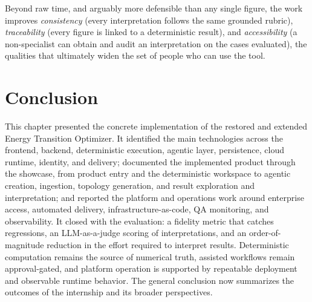 Beyond raw time, and arguably more defensible than any single figure, the work
improves \emph{consistency} (every interpretation follows the same grounded
rubric), \emph{traceability} (every figure is linked to a deterministic result),
and \emph{accessibility} (a non-specialist can obtain and audit an interpretation
on the cases evaluated), the qualities that ultimately widen the set of people who
can use the tool.

\section*{Conclusion}

This chapter presented the concrete implementation of the restored and extended
Energy Transition Optimizer. It identified the main technologies across the
frontend, backend, deterministic execution, agentic layer, persistence, cloud
runtime, identity, and delivery; documented the
implemented product through the showcase, from product entry and the deterministic
workspace to agentic creation, ingestion, topology generation, and result
exploration and interpretation; and reported the
platform and operations work around enterprise access, automated delivery,
infrastructure-as-code, QA monitoring, and observability. It closed with the
evaluation: a fidelity metric that catches regressions, an LLM-as-a-judge scoring
of interpretations, and an order-of-magnitude reduction in the effort required to
interpret results. Deterministic computation remains the source of numerical truth,
assisted workflows remain approval-gated, and platform operation is supported by
repeatable deployment and observable runtime behavior. The general conclusion now
summarizes the outcomes of the internship and its broader perspectives.
